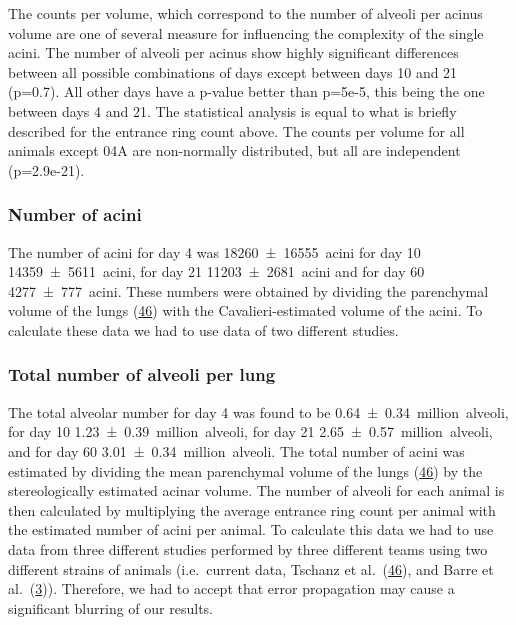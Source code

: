 \documentclass[
  american,
]{article}
\begin{document}
The counts per volume, which correspond to the number of alveoli per acinus volume are one of several measure for influencing the complexity of the single acini.
The number of alveoli per acinus show highly significant differences between all possible combinations of days except between days 10 and 21 (p=0.7).
All other days have a p-value better than p=5e-5, this being the one between days 4 and 21.
The statistical analysis is equal to what is briefly described for the entrance ring count above.
The counts per volume for all animals except 04A are non-normally distributed, but all are independent (p=2.9e-21).

\hypertarget{number-of-acini}{%
\subsubsection{Number of acini}\label{number-of-acini}}

The number of acini for day 4 was 18260~±~16555~acini for day 10 14359~±~5611~acini, for day 21 11203~±~2681~acini and for day 60 4277~±~777~acini.
These numbers were obtained by dividing the parenchymal volume of the lungs (\protect\hyperlink{ref-wnl86DEM}{46}) with the Cavalieri-estimated volume of the acini.
To calculate these data we had to use data of two different studies.

\hypertarget{total-number-of-alveoli-per-lung}{%
\subsubsection{Total number of alveoli per lung}\label{total-number-of-alveoli-per-lung}}

The total alveolar number for day 4 was found to be 0.64~±~0.34~million~alveoli, for day 10 1.23~±~0.39~million~alveoli, for day 21 2.65~±~0.57~million~alveoli, and for day 60 3.01~±~0.34~million~alveoli.
The total number of acini was estimated by dividing the mean parenchymal volume of the lungs (\protect\hyperlink{ref-wnl86DEM}{46}) by the stereologically estimated acinar volume.
The number of alveoli for each animal is then calculated by multiplying the average entrance ring count per animal with the estimated number of acini per animal.
To calculate this data we had to use data from three different studies performed by three different teams using two different strains of animals (i.e.~current data, Tschanz et al.~(\protect\hyperlink{ref-wnl86DEM}{46}), and Barre et al.~(\protect\hyperlink{ref-uFNlWogb}{3})).
Therefore, we had to accept that error propagation may cause a significant blurring of our results.
\end{document}
